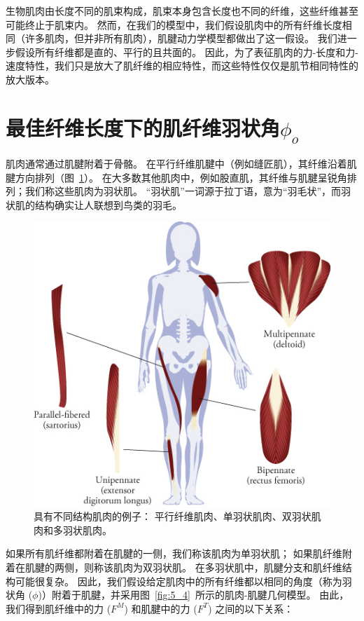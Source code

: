 生物肌肉由长度不同的肌束构成，肌束本身包含长度也不同的纤维，这些纤维甚至可能终止于肌束内。
然而，在我们的模型中，我们假设肌肉中的所有纤维长度相同（许多肌肉，但并非所有肌肉），肌腱动力学模型都做出了这一假设。
我们进一步假设所有纤维都是直的、平行的且共面的。
因此，为了表征肌肉的力-长度和力-速度特性，我们只是放大了肌纤维的相应特性，而这些特性仅仅是肌节相同特性的放大版本。



\section{最佳纤维长度下的肌纤维羽状角$\phi_o$}

肌肉通常通过肌腱附着于骨骼。
在平行纤维肌腱中（例如缝匠肌），其纤维沿着肌腱方向排列（图~\ref{fig:5_3}）。
在大多数其他肌肉中，例如股直肌，其纤维与肌腱呈锐角排列；我们称这些肌肉为羽状肌。
“羽状肌”一词源于拉丁语，意为“羽毛状”，而羽状肌的结构确实让人联想到鸟类的羽毛。

\begin{figure}[!htb]
	\centering
	\includegraphics[width=0.8\linewidth]{chap5/5_3}
	\caption{具有不同结构肌肉的例子：
		平行纤维肌肉、单羽状肌肉、双羽状肌肉和多羽状肌肉。 \label{fig:5_3}}
\end{figure}

如果所有肌纤维都附着在肌腱的一侧，我们称该肌肉为单羽状肌；
如果肌纤维附着在肌腱的两侧，则称该肌肉为双羽状肌。
在多羽状肌中，肌腱分支和肌纤维结构可能很复杂。
因此，我们假设给定肌肉中的所有纤维都以相同的角度（称为羽状角 ($\phi$)）附着于肌腱，并采用图~\ref{fig:5_4}~所示的肌肉-肌腱几何模型。
由此，我们得到肌纤维中的力 ($F^M$) 和肌腱中的力 ($F^T$) 之间的以下关系：

